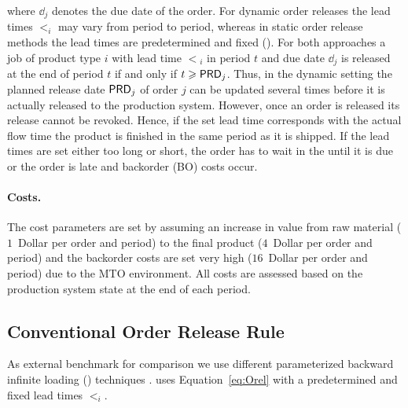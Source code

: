 \documentclass[envcountsame]{llncs}
\begin{document}
where $\dd_{j}$ denotes the due date of the order.  For dynamic order releases the lead times
$\lt_{i}$ may vary from period to period, whereas in static order release methods the lead times are
predetermined and fixed (\citealt{RagatzMabert1988,KimBobrowski1995}).
%
For both approaches a job of product type $i$ with lead time $\lt{}_{i}$ in period $t$ and due date
$\dd_{j}$ is released at the end of period $t$ if and only if $t \geqslant \mathsf{PRD}{}_{j}$.
%
Thus, in the dynamic setting  the planned
release date $\mathsf{PRD}{}_{j}$ of order $j$ can be updated several times before it is actually released
to the production system.
%
However, once an order is released its release cannot be revoked.
%
%
Hence, if the set lead time corresponds with the actual flow time the product is finished in the
same period as it is shipped. If the lead times are set either too long or short,
the order has to wait in the \fgi{} until it is due or the order is late and backorder (BO) costs
occur.

\paragraph{Costs.}
%
The cost parameters are set by assuming an increase in value from raw material ($1$~Dollar per order
and period) to the final product ($4$~Dollar per order and period) and the backorder costs are set
very high ($16$~Dollar per order and period) due to the MTO environment. All costs are assessed
based on the production system state at the end of each period.


\subsection{Conventional Order Release Rule}

As external benchmark for comparison we use different parameterized backward infinite loading
(\BIL{}) techniques \citep{Ackerman1963}. \BIL{} uses Equation~\ref{eq:Orel} with a predetermined
and fixed lead times \(\lt_{i}\).
%
%
%
\end{document}
